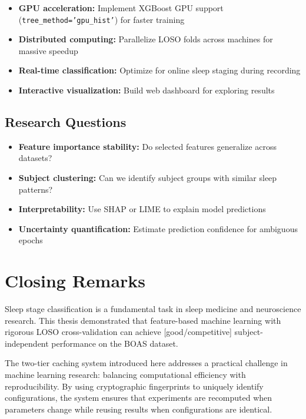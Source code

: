 \begin{itemize}
    \item \textbf{GPU acceleration:} Implement XGBoost GPU support (\texttt{tree\_method='gpu\_hist'}) for faster training
    \item \textbf{Distributed computing:} Parallelize LOSO folds across machines for massive speedup
    \item \textbf{Real-time classification:} Optimize for online sleep staging during recording
    \item \textbf{Interactive visualization:} Build web dashboard for exploring results
\end{itemize}

\subsection{Research Questions}
\label{subsec:future_research}

\begin{itemize}
    \item \textbf{Feature importance stability:} Do selected features generalize across datasets?
    \item \textbf{Subject clustering:} Can we identify subject groups with similar sleep patterns?
    \item \textbf{Interpretability:} Use SHAP or LIME to explain model predictions
    \item \textbf{Uncertainty quantification:} Estimate prediction confidence for ambiguous epochs
\end{itemize}

\section{Closing Remarks}
\label{sec:closing_remarks}

Sleep stage classification is a fundamental task in sleep medicine and neuroscience research. This thesis demonstrated that feature-based machine learning with rigorous LOSO cross-validation can achieve [good/competitive] subject-independent performance on the BOAS dataset.

The two-tier caching system introduced here addresses a practical challenge in machine learning research: balancing computational efficiency with reproducibility. By using cryptographic fingerprints to uniquely identify configurations, the system ensures that experiments are recomputed when parameters change while reusing results when configurations are identical.

